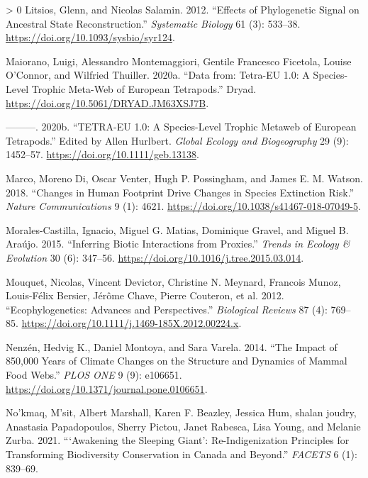 \documentclass[10pt,oneside]{article}
\newlength{\cslhangindent}
\newenvironment{CSLReferences}[3] %
 {%
  \setlength{\parindent}{0pt}
  \ifodd #1 \everypar{\setlength{\hangindent}{\cslhangindent}}\ignorespaces\fi
  \ifnum #2 > 0
  \setlength{\parskip}{#2\baselineskip}
  \fi
 }%
 {}
\begin{document}
\begin{CSLReferences}{1}{0}
\leavevmode\hypertarget{ref-Litsios2012EffPhy}{}%
Litsios, Glenn, and Nicolas Salamin. 2012. {``Effects of Phylogenetic
Signal on Ancestral State Reconstruction.''} \emph{Systematic Biology}
61 (3): 533--38. \url{https://doi.org/10.1093/sysbio/syr124}.

\leavevmode\hypertarget{ref-Maiorano2020DatTet}{}%
Maiorano, Luigi, Alessandro Montemaggiori, Gentile Francesco Ficetola,
Louise O'Connor, and Wilfried Thuiller. 2020a. {``Data from: Tetra-EU
1.0: A Species-Level Trophic Meta-Web of European Tetrapods.''} Dryad.
\url{https://doi.org/10.5061/DRYAD.JM63XSJ7B}.

\leavevmode\hypertarget{ref-Maiorano2020TetEu}{}%
---------. 2020b. {``TETRA-EU 1.0: A Species-Level Trophic Metaweb of
European Tetrapods.''} Edited by Allen Hurlbert. \emph{Global Ecology
and Biogeography} 29 (9): 1452--57.
\url{https://doi.org/10.1111/geb.13138}.

\leavevmode\hypertarget{ref-Marco2018ChaHum}{}%
Marco, Moreno Di, Oscar Venter, Hugh P. Possingham, and James E. M.
Watson. 2018. {``Changes in Human Footprint Drive Changes in Species
Extinction Risk.''} \emph{Nature Communications} 9 (1): 4621.
\url{https://doi.org/10.1038/s41467-018-07049-5}.

\leavevmode\hypertarget{ref-Morales-Castilla2015InfBio}{}%
Morales-Castilla, Ignacio, Miguel G. Matias, Dominique Gravel, and
Miguel B. Araújo. 2015. {``Inferring Biotic Interactions from
Proxies.''} \emph{Trends in Ecology \& Evolution} 30 (6): 347--56.
\url{https://doi.org/10.1016/j.tree.2015.03.014}.

\leavevmode\hypertarget{ref-Mouquet2012EcoAdv}{}%
Mouquet, Nicolas, Vincent Devictor, Christine N. Meynard, Francois
Munoz, Louis-Félix Bersier, Jérôme Chave, Pierre Couteron, et al. 2012.
{``Ecophylogenetics: Advances and Perspectives.''} \emph{Biological
Reviews} 87 (4): 769--85.
\url{https://doi.org/10.1111/j.1469-185X.2012.00224.x}.

\leavevmode\hypertarget{ref-Nenzen2014Imp850}{}%
Nenzén, Hedvig K., Daniel Montoya, and Sara Varela. 2014. {``The Impact
of 850,000 Years of Climate Changes on the Structure and Dynamics of
Mammal Food Webs.''} \emph{PLOS ONE} 9 (9): e106651.
\url{https://doi.org/10.1371/journal.pone.0106651}.

\leavevmode\hypertarget{ref-Nokmaq2021AwaSle}{}%
No'kmaq, M'sit, Albert Marshall, Karen F. Beazley, Jessica Hum, shalan
joudry, Anastasia Papadopoulos, Sherry Pictou, Janet Rabesca, Lisa
Young, and Melanie Zurba. 2021. {``{`Awakening the Sleeping Giant'}:
Re-Indigenization Principles for Transforming Biodiversity Conservation
in Canada and Beyond.''} \emph{FACETS} 6 (1): 839--69.


\end{CSLReferences}
\end{document}
